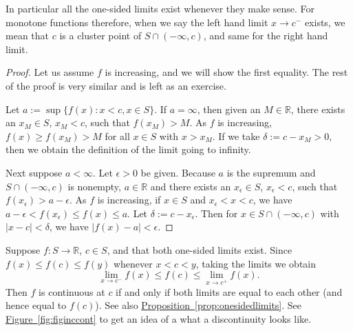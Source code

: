 \documentclass[12pt]{book}
\newcommand{\abs}[1]{\left\lvert {#1} \right\rvert}
\newcommand{\R}{{\mathbb{R}}}
\theoremstyle{plain}
\theoremstyle{remark}
\theoremstyle{definition}
\theoremstyle{exercise}
\theoremstyle{example}
\newcommand{\figureref}[1]{\hyperref[#1]{Figure~\ref*{#1}}}
\newcommand{\propref}[1]{\hyperref[#1]{Proposition~\ref*{#1}}}
\begin{document}
In particular all the one-sided limits exist whenever they make
sense.  For monotone functions therefore, when we say
the left hand limit $x \to c^-$
exists, we mean that $c$ is a cluster point of $S \cap (-\infty,c)$,
and same for the right hand limit.

\begin{proof}
Let us assume $f$ is increasing, and we will show the first
equality.  The rest of the proof is very similar and is left as an
exercise.

Let $a := \sup \{ f(x) : x < c, x \in S \}$.  If $a = \infty$,
then given an $M \in \R$, there exists an $x_M \in S$, $x_M < c$, such that $f(x_M) > M$. 
As $f$ is increasing, $f(x) \geq f(x_M) >  M$ for all $x \in S$ with $x > x_M$.  If
we take $\delta := c-x_M > 0$, then we obtain the definition of the limit going to
infinity.

Next suppose $a < \infty$.
Let $\epsilon > 0$ be given.  Because $a$ is the supremum and
$S \cap (-\infty,c)$ is nonempty, $a \in \R$ and
there exists an
$x_\epsilon \in S$,
$x_\epsilon < c$,
such that $f(x_\epsilon) > a-\epsilon$.  As $f$ is increasing,
if $x \in S$ and $x_\epsilon < x < c$, we have
$a-\epsilon < f(x_\epsilon) \leq f(x) \leq a$.  Let
$\delta := c-x_\epsilon$.  Then for $x \in S \cap (-\infty,c)$
with $\abs{x-c} < \delta$,
we have $\abs{f(x)-a} < \epsilon$.
\end{proof}

Suppose $f \colon S \to \R$, $c \in S$, and
that both one-sided limits exist.
Since $f(x) \leq f(c) \leq f(y)$
whenever $x < c < y$, taking the limits we obtain
\begin{equation*}
\lim_{x \to c^-} f(x) \leq f(c) \leq \lim_{x \to c^+} f(x) .
\end{equation*}
Then $f$ is continuous at $c$ if and only if both limits are equal
to each other (and hence equal to $f(c)$).  See also
\propref{prop:onesidedlimits}.
See \figureref{fig:figinccont} to get an idea of a what a discontinuity
looks like.
\end{document}
